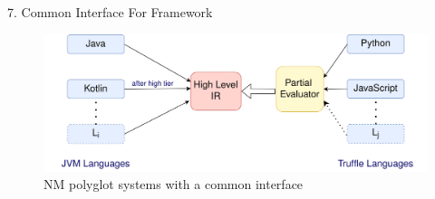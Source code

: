 \begin{roundedbeamerblock}{7. Common Interface For Framework}
    \begin{figure}[h]
        \centering
        \includegraphics[width=1.0\textwidth]{images/common_interface}
        \caption{N\times M polyglot systems with a common interface}\label{fig:figure2}
    \end{figure}
\end{roundedbeamerblock}
